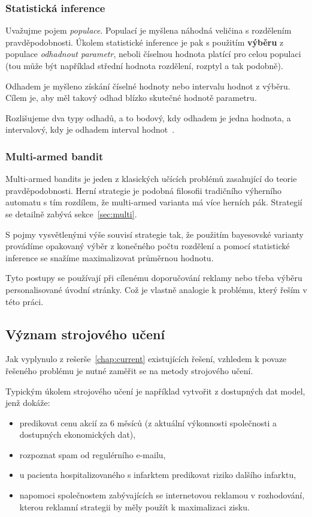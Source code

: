 \documentclass[thesis=M,czech]{FITthesis}[2014/05/07]
\begin{document}
\subsubsection{Statistická inference}
\label{inferno}
Uvažujme pojem \emph{populace}. Populací je myšlena náhodná veličina s rozdělením pravděpodobnosti. Úkolem statistické inference je pak s použitím \textbf{výběru} z populace \emph{odhadnout parametr}, neboli číselnou hodnota platící pro celou populaci (tou může být například střední hodnota rozdělení, rozptyl a tak podobně).

Odhadem je myšleno získání číselné hodnoty nebo intervalu hodnot z výběru. Cílem je, aby měl takový odhad blízko skutečné hodnotě parametru.

Rozlišujeme dva typy odhadů, a to bodový, kdy odhadem je jedna hodnota, a intervalový, kdy je odhadem interval hodnot~\cite{pst5}. 

\subsubsection{Multi-armed bandit}
\label{sub:mabandit}
Multi-armed bandits je jeden z klasických učících problémů zasahující do teorie pravděpodobnosti. Herní strategie je podobná filosofii tradičního výherního automatu s tím rozdílem, že multi-armed varianta má více herních pák. Strategií se detailně zabývá sekce~\ref{sec:multi}.

S pojmy vysvětlenými výše souvisí strategie tak, že použitím bayesovské varianty provádíme opakovaný výběr z konečného počtu rozdělení a pomocí statistické inference se snažíme maximalizovat průměrnou hodnotu.

Tyto postupy se používají při cílenému doporučování reklamy nebo třeba výběru personalisované úvodní stránky. Což je vlastně analogie k problému, který řeším v této práci.

\subsection{Význam strojového učení}
\label{sec:machine}

Jak vyplynulo z rešerše~\ref{chap:current} existujících řešení, vzhledem k povaze řešeného problému je nutné zaměřit se na metody strojového učení. 

Typickým úkolem strojového učení je například vytvořit z dostupných dat model, jenž dokáže:

\begin{itemize}
  \item predikovat cenu akcií za 6 měsíců (z aktuální výkonnosti společnosti a dostupných ekonomických dat),
  \item rozpoznat spam od regulérního e-mailu,
  \item u pacienta hospitalizovaného s infarktem predikovat riziko dalšího infarktu,
  \item napomoci společnostem zabývajících se internetovou reklamou v rozhodování, kterou reklamní strategii by měly použít k maximalizaci zisku.
\end{itemize}
\end{document}
